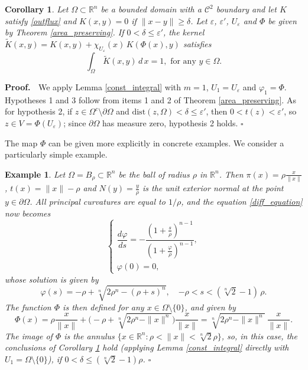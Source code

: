 \documentclass[a4paper,12pt]{amsart}
\newtheorem{cor}[theorem]{Corollary}
\newtheorem{ex}[theorem]{Example}
\renewcommand{\proof}{{\noindent \bf Proof. \ }}
\newcommand{\eproof}{\hfill \mbox{${\square}$}}
\newcommand{\R}{\mathbb{R}}
\newcommand{\dist}{\textrm{dist}}
\begin{document}
  \begin{cor}\label{suitable_kernel}
   Let $\Omega \subset \R^n$ be a {bounded} domain with a $\mathcal{C}^2$ boundary {and let $K$ satisfy \eqref{outflux} and}
 $K(x,y) = 0 $ if $ \|x-y\| {\geq} \delta $. {Let $\varepsilon$, $\varepsilon'$, $U_\varepsilon$ and $\Phi$ be given by Theorem \ref{area_preserving}.
 If $0 < \delta \leq \varepsilon'$, the kernel
 $ \tilde{K} (x,y) =  K(x,y) + \chi_{U_\varepsilon}(x)\, K (\Phi(x),y)$}
 satisfies
 \[  \int_{\Omega} \, \tilde{K}(x,y) \, d \,x =1, \textrm{  for any }  y \in \Omega.\]
  \end{cor}
  \proof {We apply Lemma \ref{const_integral} with $m = 1$, $U_1 = U_\varepsilon$ and $\varphi_1 = \Phi$. Hypotheses 1 and 3 follow from items 1 and 2 of Theorem \ref{area_preserving}. As for hypothesis 2, if $z \in \Omega^c \setminus \partial\Omega$ and $\dist(z,\Omega) < \delta \leq \varepsilon'$, then $0 < t(z) < \varepsilon'$, so $z \in V = \Phi(U_\varepsilon)$; since $\partial\Omega$ has measure zero, hypothesis 2 holds.}  \eproof

 The map $\Phi$ can be given more {explicitly} in concrete examples. We consider a particularly simple example.

   \begin{ex} \label{ex_ball}
   Let $\Omega = B_{\rho} \subset \R^n$ be the ball of radius $\rho$ in $\R^n$.
   Then $ \pi(x) = \rho \frac{x}{\|x\|} $, $t(x) = \|x\| - \rho $
    and $N(y) = \frac{y}{\rho}$ is the unit exterior normal at the point
 $y \in \partial \Omega$. {All principal curvatures are equal to $1/\rho$, and}
 the equation \eqref{diff_equation} now becomes
 \[
  \begin{cases}
 \dfrac{d\varphi}{ds} = -\dfrac{(1+ \frac{s}{{\rho}})^{n-1}}{(1+ \frac{\varphi}{{\rho}})^{n-1}},\\[2mm]
 \varphi(0) = 0,
\end{cases} \]
whose solution is given by
$$\varphi(s) = - \rho + \sqrt[n]{2\rho^n - (\rho+s)^n}, \quad
 {-\rho < s < (\sqrt[n]{2}-1)\, \rho}.$$
The function $\Phi$ is then defined for any $x \in \Omega\setminus \{0\} $, and given by
 \[\Phi(x) = \rho \frac{x}{\|x\|} + \big( -\rho + \sqrt[n]{2\rho^n -  \|x\|^n}  \big)
  \frac{x}{\|x\|} { = \sqrt[n]{2\rho^n - \|x\|^n}\, \frac{x}{\|x\|}}. \]
  The image of $\Phi$ is the annulus $ \{ x\in \R^n: \rho < \|x\| < \sqrt[n]{2} \rho \}$, so, in this case, the conclusions of Corollary \ref{suitable_kernel} hold {(applying Lemma \ref{const_integral} directly with $U_1 = \Omega\setminus\{0\}$)}, if
  $0< \delta \leq  (\sqrt[n]{2} -1) \rho $.  \eproof
   \end{ex}
\end{document}
